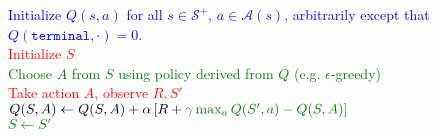 \documentclass{standalone}
\begin{document}
\pagestyle{empty}
\begin{algorithm}[H]
  \KwInput{Step size $\alpha \in (0, 1]$, and a small $\epsilon > 0$.}
  \textcolor{blue}{Initialize $Q(s,a)$ for all $s \in \mathcal S^+$, $a \in \mathcal A(s)$,   arbitrarily except that $Q(\texttt{terminal}, \cdot) = 0$.\\}
 {
  \textcolor{red}{Initialize $S$} \\
   {
\textcolor{Green}{Choose $A$ from $S$ using policy derived from $Q$ (e.g. $\epsilon$-greedy)} \\
\textcolor{red}{Take action $A$, observe $R, S'$ \\}
\textcolor{blue}{
    $Q(S,A) \gets Q(S,A) + \alpha \left[R + \color{Green}{\gamma \max_a Q(S', a)} -       Q(S,A)\right]$ \\}
    \textcolor{Green}{$S \gets S'$} 
  }
}
\end{algorithm}
\end{document}
